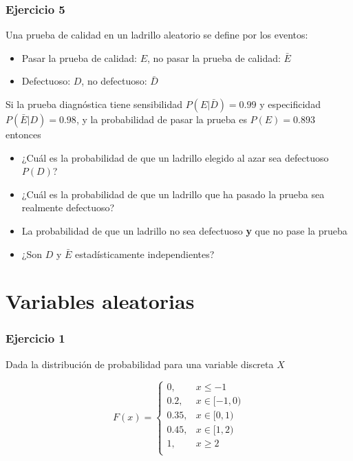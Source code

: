 \documentclass[
]{book}
\providecommand{\tightlist}{%
  \setlength{\itemsep}{0pt}\setlength{\parskip}{0pt}}
\begin{document}
\hypertarget{ejercicio-5}{%
\subsubsection{Ejercicio 5}\label{ejercicio-5}}

Una prueba de calidad en un ladrillo aleatorio se define por los eventos:

\begin{itemize}
\tightlist
\item
  Pasar la prueba de calidad: \(E\), no pasar la prueba de calidad: \(\bar{E}\)
\item
  Defectuoso: \(D\), no defectuoso: \(\bar{D}\)
\end{itemize}

Si la prueba diagnóstica tiene sensibilidad \(P(E|\bar{D})=0.99\) y especificidad \(P(\bar{E}|D)=0.98\), y la probabilidad de pasar la prueba es \(P(E) =0.893\) entonces

\begin{itemize}
\item
  ¿Cuál es la probabilidad de que un ladrillo elegido al azar sea defectuoso \(P(D)\)?
\item
  ¿Cuál es la probabilidad de que un ladrillo que ha pasado la prueba sea realmente defectuoso?
\item
  La probabilidad de que un ladrillo no sea defectuoso \textbf{y} que no pase la prueba
\item
  ¿Son \(D\) y \(\bar{E}\) estadísticamente independientes?
\end{itemize}

\hypertarget{variables-aleatorias}{%
\section{Variables aleatorias}\label{variables-aleatorias}}

\hypertarget{ejercicio-1-3}{%
\subsubsection{Ejercicio 1}\label{ejercicio-1-3}}

Dada la distribución de probabilidad para una variable discreta \(X\)

\[
    F(x)= 
\begin{cases}
0, & x \leq -1 \\
0.2,& x \in [-1,0)\\
0.35,& x \in [0,1)\\
0.45,& x \in [1,2)\\
1,& x \geq 2\\
\end{cases}
\]
\end{document}
